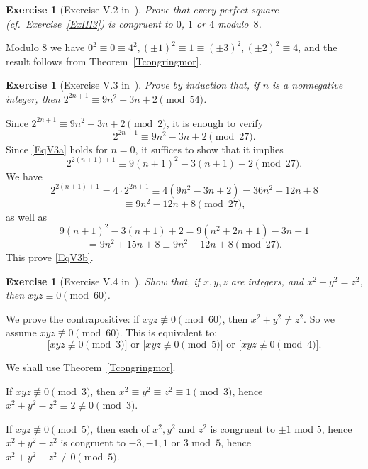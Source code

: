 \documentclass[12pt,letterpaper]{article}
\newtheorem{exer}[thm]{Exercise}
\theoremstyle{definition}
\begin{document}
\begin{exer}[Exercise V.2 in~\cite{weil1979}]\label{ExV2} 
Prove that every perfect square (cf.\ Exercise~\ref{ExIII3}) is congruent to $0$, $1$ or $4$ modulo~$8$.
\end{exer}

Modulo $8$ we have $0^2 \equiv 0 \equiv 4^2, (\pm 1)^2 \equiv 1 \equiv (\pm 3)^2, (\pm 2)^2 \equiv 4$, and the result follows from Theorem~\ref{Tcongringmor}. 

\begin{exer}[Exercise V.3 in~\cite{weil1979}] 
Prove by induction that, if $n$ is a nonnegative integer, then $2^{2n+1} \equiv 9n^2-3n+2 \pmod{54}$.
\end{exer} 

Since $2^{2n+1} \equiv 9n^2-3n+2 \pmod{2}$, it is enough to verify 
\begin{equation}\label{EqV3a}
2^{2n+1} \equiv 9n^2-3n+2 \pmod{27}.
\end{equation} 
Since \eqref{EqV3a} holds for $n=0$, it suffices to show that it implies 
\begin{equation}\label{EqV3b}
2^{2(n+1)+1} \equiv 9(n+1)^2-3(n+1)+2 \pmod{27}.
\end{equation} 
We have 
$$
2^{2(n+1)+1}=4\cdot 2^{2n+1}\equiv 4(9n^2-3n+2)=36n^2-12n+8
$$ 
$$
\equiv 9n^2-12n+8 \pmod{27},
$$ 
as well as 
$$
9(n+1)^2-3(n+1)+2=9(n^2+2n+1)-3n-1
$$ 
$$
=9n^2+15n+8\equiv 9n^2-12n+8 \pmod{27}.
$$ 
This prove \eqref{EqV3b}. 

\begin{exer}[Exercise V.4 in~\cite{weil1979}]
Show that, if $x,y,z$ are integers, and $x^2+y^2=z^2$, then $xyz\equiv 0\pmod{60}$.
\end{exer}

We prove the contrapositive: if $xyz \not\equiv 0\pmod{60}$, then $x^2+y^2 \ne z^2$. So we assume $xyz \not\equiv 0\pmod{60}$. This is equivalent to: 
$$
\big[xyz \not\equiv 0 \pmod{3}\big] \text{ or } \big[xyz \not\equiv 0 \pmod{5}\big] \text{ or } \big[xyz \not\equiv 0 \pmod{4}\big].
$$ 

We shall use Theorem~\ref{Tcongringmor}. 

If $xyz \not\equiv 0 \pmod{3}$, then $x^2 \equiv y^2 \equiv z^2 \equiv 1 \pmod{3}$, hence $x^2+y^2-z^2 \equiv 2 \not\equiv 0 \pmod{3}$. 

If $xyz \not\equiv 0 \pmod{5}$, then each of $x^2, y^2$ and $z^2$ is congruent to $\pm 1$ mod $5$, hence $x^2+y^2-z^2$ is congruent to $-3, -1, 1$ or $3$ mod~$5$, hence $x^2+y^2-z^2 \not\equiv 0 \pmod{5}$. 
\end{document}
